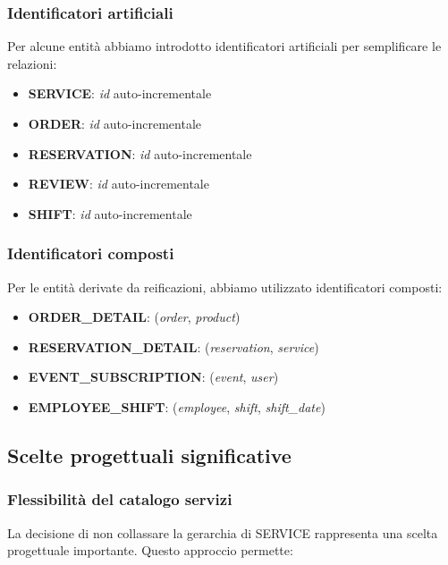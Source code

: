 \documentclass[a4paper,12pt]{report}
\begin{document}
\subsubsection{Identificatori artificiali}

Per alcune entità abbiamo introdotto identificatori artificiali per semplificare le relazioni:

\begin{itemize}
    \item \textbf{SERVICE}: \textit{id} auto-incrementale
    \item \textbf{ORDER}: \textit{id} auto-incrementale
    \item \textbf{RESERVATION}: \textit{id} auto-incrementale
    \item \textbf{REVIEW}: \textit{id} auto-incrementale
    \item \textbf{SHIFT}: \textit{id} auto-incrementale
\end{itemize}

\subsubsection{Identificatori composti}

Per le entità derivate da reificazioni, abbiamo utilizzato identificatori composti:

\begin{itemize}
    \item \textbf{ORDER\_DETAIL}: (\textit{order}, \textit{product})
    \item \textbf{RESERVATION\_DETAIL}: (\textit{reservation}, \textit{service})
    \item \textbf{EVENT\_SUBSCRIPTION}: (\textit{event}, \textit{user})
    \item \textbf{EMPLOYEE\_SHIFT}: (\textit{employee}, \textit{shift}, \textit{shift\_date})
\end{itemize}

\subsection{Scelte progettuali significative}

\subsubsection{Flessibilità del catalogo servizi}

La decisione di non collassare la gerarchia di SERVICE rappresenta una scelta progettuale importante. Questo approccio permette:
\end{document}
